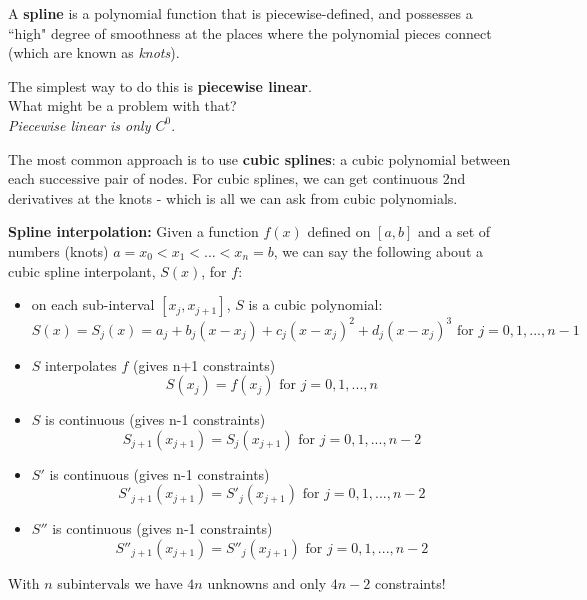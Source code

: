 \documentclass[12pt]{article}
\begin{document}
%
%
%
%
%
A \textbf{spline} is a polynomial function that is piecewise-defined, and possesses a ``high" degree of smoothness at the places where the polynomial pieces connect (which are known as \textit{knots}).

The simplest way to do this is \textbf{piecewise linear}.\\ What might be a problem with that?\\ \textit{Piecewise linear is only $C^0$}.

The most common approach is to use \textbf{cubic splines}: a cubic polynomial between each successive pair of nodes. For cubic splines, we can get continuous 2nd derivatives at the knots - which is all we can ask from cubic polynomials. 

\textbf{Spline interpolation:} Given a function $f(x)$ defined on $[a,b]$ and a set of numbers (knots) $a=x_0 < x_1 < ... < x_n = b$, we can say the following about a cubic spline interpolant, $S(x)$, for $f$:
%
\begin{itemize}
\item on each sub-interval $[x_j, x_{j+1}]$, $S$ is a cubic polynomial:
\[S(x) = S_j(x) = a_j + b_j(x-x_j) + c_j(x-x_j)^2 + d_j(x-x_j)^3 \text{ for } j = 0, 1, ..., n-1\]

\item $S$ interpolates $f$ (gives n+1 constraints)
\[S(x_j) = f(x_j)\text{ for } j = 0, 1, ..., n\]

\item $S$ is continuous (gives n-1 constraints)
\[S_{j+1}(x_{j+1}) = S_{j}(x_{j+1})\text{ for } j = 0, 1, ..., n-2\]

\item $S'$ is continuous (gives n-1 constraints)
\[S'_{j+1}(x_{j+1}) = S'_{j}(x_{j+1})\text{ for } j = 0, 1, ..., n-2\]

\item $S''$ is continuous (gives n-1 constraints)
\[S''_{j+1}(x_{j+1}) = S''_{j}(x_{j+1})\text{ for } j = 0, 1, ..., n-2\]
\end{itemize}
%
With $n$ subintervals we have $4n$ unknowns and only $4n-2$ constraints!
\end{document}

